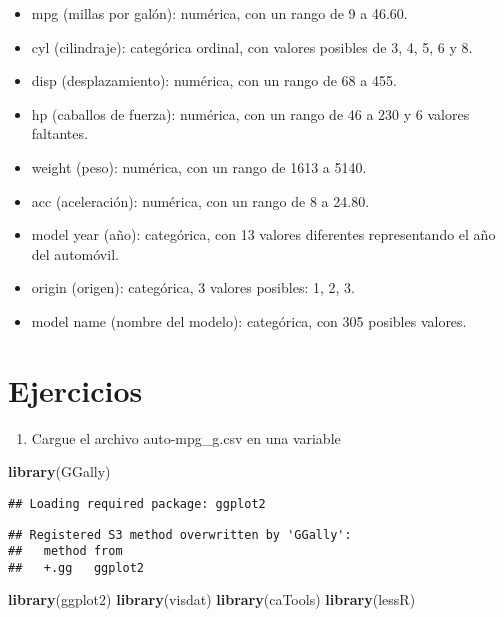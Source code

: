\documentclass[]{article}
\newenvironment{Shaded}{\begin{snugshade}}{\end{snugshade}}
\newcommand{\KeywordTok}[1]{\textcolor[rgb]{0.13,0.29,0.53}{\textbf{#1}}}
\newcommand{\NormalTok}[1]{#1}
\providecommand{\tightlist}{%
  \setlength{\itemsep}{0pt}\setlength{\parskip}{0pt}}
\begin{document}
\begin{itemize}
\tightlist
\item
  mpg (millas por galón): numérica, con un rango de 9 a 46.60.
\item
  cyl (cilindraje): categórica ordinal, con valores posibles de 3, 4, 5,
  6 y 8.
\item
  disp (desplazamiento): numérica, con un rango de 68 a 455.
\item
  hp (caballos de fuerza): numérica, con un rango de 46 a 230 y 6
  valores faltantes.
\item
  weight (peso): numérica, con un rango de 1613 a 5140.
\item
  acc (aceleración): numérica, con un rango de 8 a 24.80.
\item
  model year (año): categórica, con 13 valores diferentes representando
  el año del automóvil.
\item
  origin (origen): categórica, 3 valores posibles: 1, 2, 3.
\item
  model name (nombre del modelo): categórica, con 305 posibles valores.
\end{itemize}

\hypertarget{ejercicios}{%
\section{Ejercicios}\label{ejercicios}}

\begin{enumerate}
\def\labelenumi{\arabic{enumi}.}
\tightlist
\item
  Cargue el archivo auto-mpg\_g.csv en una variable
\end{enumerate}

\begin{Shaded}
\begin{Highlighting}[]
\KeywordTok{library}\NormalTok{(GGally)}
\end{Highlighting}
\end{Shaded}

\begin{verbatim}
## Loading required package: ggplot2
\end{verbatim}

\begin{verbatim}
## Registered S3 method overwritten by 'GGally':
##   method from   
##   +.gg   ggplot2
\end{verbatim}

\begin{Shaded}
\begin{Highlighting}[]
\KeywordTok{library}\NormalTok{(ggplot2)}
\KeywordTok{library}\NormalTok{(visdat)}
\KeywordTok{library}\NormalTok{(caTools)}
\KeywordTok{library}\NormalTok{(lessR)}
\end{Highlighting}
\end{Shaded}
\end{document}
